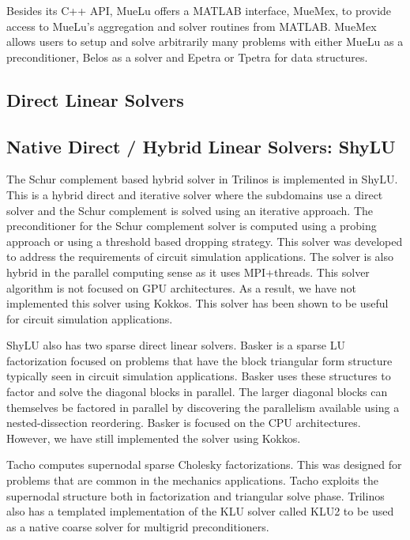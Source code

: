 Besides its C++ API, MueLu offers a MATLAB interface, MueMex, to provide access to MueLu's aggregation and solver routines from MATLAB.
MueMex allows users to setup and solve arbitrarily many problems with either MueLu as a preconditioner, Belos as a solver and Epetra or Tpetra for data structures.


\subsection{Direct Linear Solvers}


\subsection{Native Direct / Hybrid Linear Solvers: ShyLU}
 The Schur complement based hybrid solver in Trilinos is implemented in ShyLU. This is a hybrid direct and iterative solver where the subdomains use a direct solver and the Schur complement is solved using an iterative approach. The preconditioner for the Schur complement solver is computed using a probing approach or using a threshold based dropping strategy. This solver was developed to address the requirements of circuit simulation applications. The solver is also hybrid in the parallel computing sense as it uses MPI+threads. This  solver algorithm is not focused on GPU architectures. As a result, we have not implemented this solver using Kokkos. This solver has been shown to be useful for circuit simulation applications.

 ShyLU also has two sparse direct linear solvers. Basker is a sparse LU factorization focused on problems that have the block triangular form structure typically seen in circuit simulation applications. Basker uses these structures to factor and solve the diagonal blocks in parallel. The larger diagonal blocks can themselves be factored in parallel by discovering the parallelism available using a nested-dissection reordering. Basker is focused on the CPU architectures. However, we have still implemented the solver using Kokkos. 

 Tacho computes supernodal sparse Cholesky factorizations. This was designed for problems that are common in the mechanics applications. Tacho exploits the supernodal structure both in factorization and triangular solve phase.  Trilinos also has a templated implementation of the KLU solver called KLU2 to be used as a native coarse solver for multigrid preconditioners.


